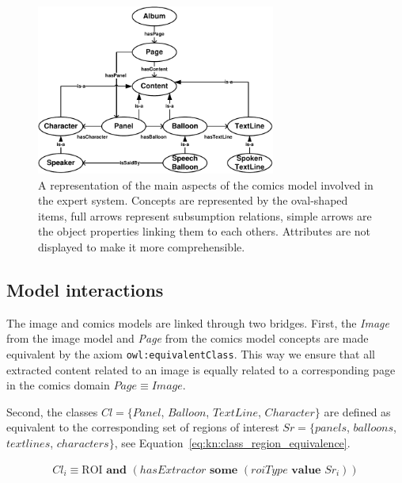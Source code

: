  \begin{figure}[!ht]
   \centering
  \includegraphics[width=0.7\textwidth]{model_comics.pdf}
  \caption[A representation of the main aspects of the comics model involved in the expert system]{A representation of the main aspects of the comics model involved in the expert system. Concepts are represented by the oval-shaped items, full arrows represent subsumption relations, simple arrows are the object properties linking them to each others. Attributes are not displayed to make it more comprehensible.}
  \label{fig:kn:model_image}
 \end{figure}

\subsection{Model interactions}
The image and comics models are linked through two bridges.
First, the \textit{Image} from the image model and \textit{Page} from the comics model concepts are made equivalent by the axiom \texttt{owl:equivalentClass}.
This way we ensure that all extracted content related to an image is equally related to a corresponding page in the comics domain $Page \equiv  Image$.

Second, the classes $Cl=\{Panel$, $Balloon$, $TextLine$, $Character\}$ are defined as equivalent to the corresponding set of regions of interest $Sr = \{panels$, $balloons$, $text lines$, $characters\}$, see Equation~\ref{eq:kn:class_region_equivalence}.%
	

\begin{equation}
\label{eq:kn:class_region_equivalence}
\begin{split}
Cl_i  \equiv \text{ROI} \textbf{ and } (hasExtractor \textbf{ some } (roiType \textbf{ value } Sr_i ))
\end{split}
\end{equation}

